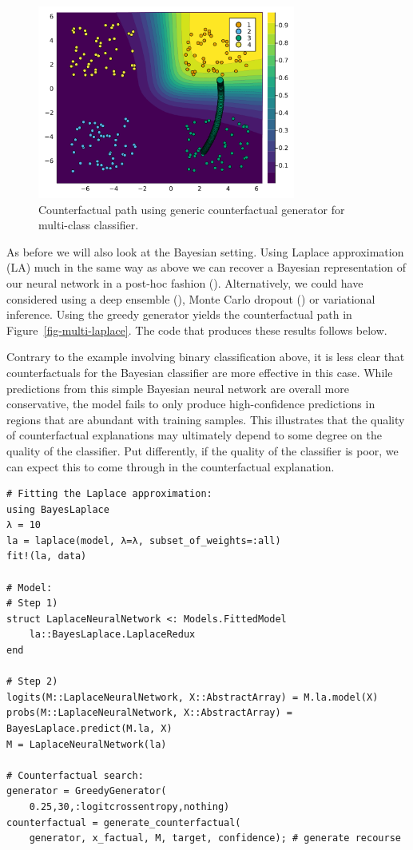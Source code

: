 \documentclass[
  letterpaper,
  DIV=11,
  numbers=noendperiod]{scrartcl}
\begin{document}
\begin{figure}

{\centering \includegraphics[width=3.33333in,height=2.5in]{www/ce_multi.png}

}

\caption{\label{fig-multi}Counterfactual path using generic
counterfactual generator for multi-class classifier.}

\end{figure}

As before we will also look at the Bayesian setting. Using Laplace
approximation (LA) much in the same way as above we can recover a
Bayesian representation of our neural network in a post-hoc fashion
(\cite{daxberge2021laplace}). Alternatively, we could have considered
using a deep ensemble (\cite{lakshminarayanan2016simple}), Monte Carlo
dropout (\cite{gal2016dropout}) or variational inference. Using the
greedy generator yields the counterfactual path in
Figure~\ref{fig-multi-laplace}. The code that produces these results
follows below.

Contrary to the example involving binary classification above, it is
less clear that counterfactuals for the Bayesian classifier are more
effective in this case. While predictions from this simple Bayesian
neural network are overall more conservative, the model fails to only
produce high-confidence predictions in regions that are abundant with
training samples. This illustrates that the quality of counterfactual
explanations may ultimately depend to some degree on the quality of the
classifier. Put differently, if the quality of the classifier is poor,
we can expect this to come through in the counterfactual explanation.

\begin{lstlisting}
# Fitting the Laplace approximation:
using BayesLaplace
λ = 10
la = laplace(model, λ=λ, subset_of_weights=:all)
fit!(la, data)

# Model:
# Step 1)
struct LaplaceNeuralNetwork <: Models.FittedModel
    la::BayesLaplace.LaplaceRedux
end

# Step 2)
logits(M::LaplaceNeuralNetwork, X::AbstractArray) = M.la.model(X)
probs(M::LaplaceNeuralNetwork, X::AbstractArray) = BayesLaplace.predict(M.la, X)
M = LaplaceNeuralNetwork(la)

# Counterfactual search:
generator = GreedyGenerator(
    0.25,30,:logitcrossentropy,nothing)
counterfactual = generate_counterfactual(
    generator, x_factual, M, target, confidence); # generate recourse
\end{lstlisting}
\end{document}
